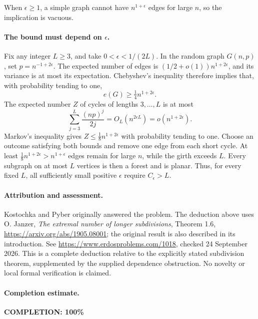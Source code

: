 When \(\epsilon\geq1\), a simple graph cannot have \(n^{1+\epsilon}\) edges for large \(n\), so the implication is vacuous.

\paragraph{The bound must depend on \(\epsilon\).}
Fix any integer \(L\geq3\), and take \(0<\epsilon<1/(2L)\). In the random graph \(G(n,p)\), set \(p=n^{-1+2\epsilon}\). The expected number of edges is \((1/2+o(1))n^{1+2\epsilon}\), and its variance is at most its expectation. Chebyshev's inequality therefore implies that, with probability tending to one,
\[
 e(G)\geq\tfrac14n^{1+2\epsilon}.
\]
The expected number \(Z\) of cycles of lengths \(3,\ldots,L\) is at most
\[
 \sum_{j=3}^{L}\frac{(np)^j}{2j}
 =O_L(n^{2\epsilon L})=o(n^{1+2\epsilon}).
\]
Markov's inequality gives \(Z\leq\tfrac18n^{1+2\epsilon}\) with probability tending to one. Choose an outcome satisfying both bounds and remove one edge from each short cycle. At least \(\tfrac18n^{1+2\epsilon}>n^{1+\epsilon}\) edges remain for large \(n\), while the girth exceeds \(L\). Every subgraph on at most \(L\) vertices is then a forest and is planar. Thus, for every fixed \(L\), all sufficiently small positive \(\epsilon\) require \(C_\epsilon>L\).

\paragraph{Attribution and assessment.}
Kostochka and Pyber originally answered the problem. The deduction above uses O. Janzer, \emph{The extremal number of longer subdivisions}, Theorem 1.6, \url{https://arxiv.org/abs/1905.08001}; the original result is also described in its introduction. See \url{https://www.erdosproblems.com/1018}, checked 24 September 2026. This is a complete deduction relative to the explicitly stated subdivision theorem, supplemented by the supplied dependence obstruction. No novelty or local formal verification is claimed.

\paragraph{Completion estimate.}
\textbf{COMPLETION: 100\%}
